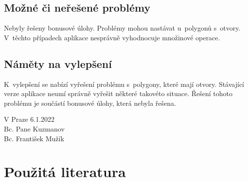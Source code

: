 \documentclass[a4paper, 12pt, oneside, titlepage]{article} %
\begin{document}
\subsection{Možné či neřešené problémy} \label{mcn_problemy}
Nebyly řešeny bonusové úlohy. Problémy mohou nastávat u~polygonů s~otvory. V~těchto případech aplikace nesprávně vyhodnocuje množinové operace.

\subsection{Náměty na vylepšení} \label{vylepseni}
K~vylepšení se nabízí vyřešení problému s~polygony, které mají otvory. Stávající verze aplikace neumí správně vyřešit některé takovéto situace. Řešení tohoto problému je součástí bonusové úlohy, která nebyla řešena.




\begin{flushright}
V Praze 6.1.2022\\
\vspace{2mm}
Bc. Pane Kuzmanov\\
Bc. František Mužík\\
\end{flushright}


\clearpage 
\section*{Použitá literatura}
\renewcommand{\section}[2]{}%


\end{document}
